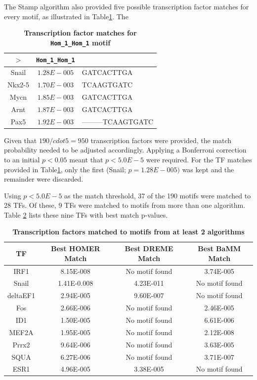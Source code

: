 \documentclass[12pt]{article}
\begin{document}
The Stamp algorithm also provided five possible transcription factor matches for every motif, as illustrated in Table\ref{5tfs}. The 

\begin{table}[!htbp]
\caption{\bf{Transcription factor matches for \texttt{Hom\_1\_Hom\_1} motif}}
\label{5tfs}
\centering
\begin{tabular}{|c|c|l|}
\hline
$>$ & \texttt{Hom\_1\_Hom\_1} & \\
\hline
Snail & $1.28E-005$ & GATCACTTGA\\
\hline
Nkx2-5 & $1.70E-003$ & TCAAGTGATC\\
\hline
Mycn & $1.85E-003$ & GATCACTTGA\\
\hline
Arnt & $1.87E-003$ & GATCACTTGA\\
\hline
Pax5 & $1.92E-003$ & ---------TCAAGTGATC\\
\hline
\end{tabular}
\end{table}

Given that $190 /cdot 5 = 950$ transcription factors were provided, the match probability needed to be adjusted accordingly. Applying a Bonferroni correction to an initial $p < 0.05$ meant that $p < 5.0E-5$ were required. For the TF matches provided in Table\ref{5tfs}, only the first (Snail; $p=1.28E-005)$ was kept and the remainder were discarded. 

Using $p < 5.0E-5$ as the match threshold, 37 of the 190 motifs were matched to 28 TFs. Of these, 9 TFs were matched to motifs from more than one algorithm.
Table \ref{tfsWithMotifs} lists these nine TFs with best match p-values.

\begin{table}[!htbp]
\caption{\bf{Transcription factors matched to motifs from at least 2 algorithms}}
\label{tfsWithMotifs}
\centering
\begin{tabular}{|c|c|c|c|}
\hline
TF & Best HOMER Match & Best DREME Match & Best BaMM Match\\
\hline
IRF1 & 8.15E-008 & No motif found & 3.74E-005\\
\hline
Snail & 1.41E-0.008 & 4.23E-011 & No motif found\\
\hline
deltaEF1 & 2.94E-005 & 9.60E-007 & No motif found\\
\hline
Fos & 2.66E-006 & No motif found & 2.46E-005\\
\hline
ID1 & 1.50E-005 & No motif found & 6.61E-006\\
\hline
MEF2A & 1.95E-005 & No motif found & 2.12E-008\\
\hline
Prrx2 & 9.64E-006 & No motif found & 3.63E-005\\
\hline
SQUA & 6.27E-006 & No motif found & 3.71E-007\\
\hline
ESR1 & 4.96E-005 & 3.38E-005 & No motif found\\
\hline
\end{tabular}
\end{table}
\end{document}
